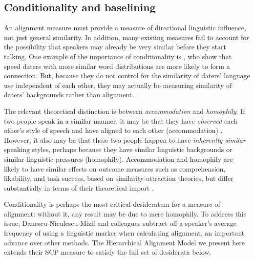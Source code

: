 \documentclass{acm_proc_article-sp}
\begin{document}

\subsection{Conditionality and baselining} 

An alignment measure must provide a measure of directional linguistic influence, not just general similarity. In addition, many existing measures fail to account for the possibility that speakers may already be very similar before they start talking.  One example of the importance of conditionality is \cite{IrelandEtAl2011}, who show that speed daters with more similar word distributions are more likely to form a connection. But, because they do not control for the similarity of daters' language use independent of each other, they may actually be measuring similarity of daters' backgrounds rather than alignment.

The relevant theoretical distinction is between \textit{accommodation} and \textit{homophily}.  If two people speak in a similar manner, it may be that they have \emph{observed} each other's style of speech and have aligned to each other (accommodation) \cite{DNMGamonDumais2011}. However, it also may be that these two people happen to have \emph{inherently similar} speaking styles, perhaps because they have similar linguistic backgrounds or similar linguistic pressures (homophily). Accommodation and homophily are likely to have similar effects on outcome measures such as comprehension, likability, and task success, based on similarity-attraction theories, but differ substantially in terms of their theoretical import \cite{Byrne1969,Triandis1960,GilesSmith1979}.  

Conditionality is perhaps the most critical desideratum for a measure of alignment: without it, any result may be due to mere homophily. To address this issue, Danescu-Niculescu-Mizil and colleagues \cite{DNMGamonDumais2011,DNMLee2011,DNMEtAl2012} subtract off a speaker's average frequency of using a linguistic marker when calculating alignment, an important advance over other methods. The Hierarchical Alignment Model we present here extends their SCP measure to satisfy the full set of desiderata below. 

\end{document}
